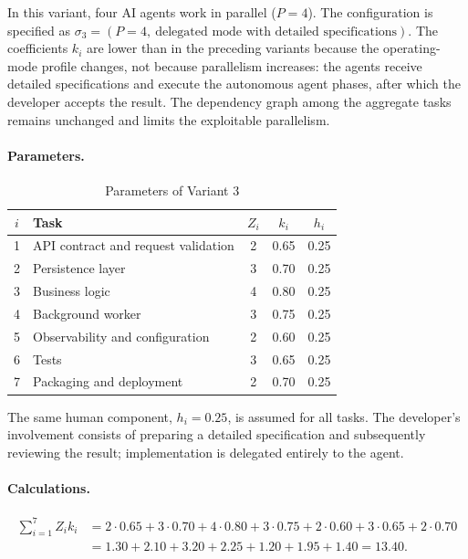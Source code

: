 
In this variant, four AI agents work in parallel ($P = 4$). The configuration
is specified as
$\sigma_3 = (P{=}4,\ \text{delegated mode with detailed specifications})$.
The coefficients $k_i$ are lower than in the preceding variants because the
operating-mode profile changes, not because parallelism increases: the agents
receive detailed specifications and execute the autonomous agent phases, after
which the developer accepts the result. The dependency graph among the
aggregate tasks remains unchanged and limits the exploitable parallelism.

\paragraph{Parameters.}
\begin{table}[ht!]
\centering
\caption{Parameters of Variant 3}
\label{tab:practical-v3-params}
\begin{tabular}{clccc}
\toprule
$i$ & Task & $Z_i$ & $k_i$ & $h_i$ \\
\midrule
1 & API contract and request validation & 2 & 0.65 & 0.25 \\
2 & Persistence layer & 3 & 0.70 & 0.25 \\
3 & Business logic & 4 & 0.80 & 0.25 \\
4 & Background worker & 3 & 0.75 & 0.25 \\
5 & Observability and configuration & 2 & 0.60 & 0.25 \\
6 & Tests & 3 & 0.65 & 0.25 \\
7 & Packaging and deployment & 2 & 0.70 & 0.25 \\
\bottomrule
\end{tabular}
\end{table}

The same human component, $h_i = 0.25$, is assumed for all tasks. The
developer's involvement consists of preparing a detailed specification and
subsequently reviewing the result; implementation is delegated entirely to the
agent.

\paragraph{Calculations.}
\begin{align*}
  \sum_{i=1}^{7} Z_i k_i &= 2{\cdot}0.65 + 3{\cdot}0.70 + 4{\cdot}0.80 + 3{\cdot}0.75 + 2{\cdot}0.60 + 3{\cdot}0.65 + 2{\cdot}0.70 \\
  &= 1.30 + 2.10 + 3.20 + 2.25 + 1.20 + 1.95 + 1.40 = 13.40.
\end{align*}


